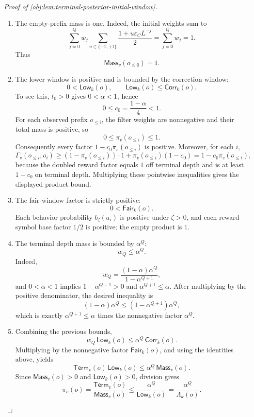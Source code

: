 \begin{proof}[Proof of \cref{obj:lem:terminal-posterior-initial-window}]
\begin{enumerate}
\item The empty-prefix mass is one.  Indeed, the initial weights sum to
\[
\sum_{j=0}^Q
w_j
\sum_{u\in\{-1,+1\}}
\frac{1+u\varepsilon_C L^{-j}}2
=
\sum_{j=0}^Q w_j
=
1.
\]
Thus
\[
\mathsf{Mass}_v(o_{\le0})=1.
\]

\item The lower window is positive and is bounded by the correction window:
\[
0<\mathsf{Low}_k(o),
\qquad
\mathsf{Low}_k(o)\le \mathsf{Corr}_k(o).
\]
To see this, \(t_0>0\) gives \(0<\alpha<1\), hence
\[
0\le c_0=\frac{1-\alpha}{4}<1.
\]
For each observed prefix \(o_{\le i}\), the filter weights are nonnegative and their total mass is positive, so
\[
0\le \pi_v(o_{\le i})\le 1.
\]
Consequently every factor \(1-c_0\pi_v(o_{\le i})\) is positive.  Moreover, for each \(i\),
\[
\Gamma_v(o_{\le i},o_i)
\ge
(1-\pi_v(o_{\le i}))\cdot 1
+
\pi_v(o_{\le i})(1-c_0)
=
1-c_0\pi_v(o_{\le i}),
\]
because the doubled reward factor equals \(1\) off terminal depth and is at least \(1-c_0\) on terminal depth.  Multiplying these pointwise inequalities gives the displayed product bound.

\item The fair-window factor is strictly positive:
\[
0<\mathsf{Fair}_k(o).
\]
Each behavior probability \(b_\zeta(a_i)\) is positive under \(\zeta>0\), and each reward-symbol base factor \(1/2\) is positive; the empty product is \(1\).

\item The terminal depth mass is bounded by \(\alpha^Q\):
\[
w_Q\le \alpha^Q.
\]
Indeed,
\[
w_Q=\frac{(1-\alpha)\alpha^Q}{1-\alpha^{Q+1}},
\]
and \(0<\alpha<1\) implies \(1-\alpha^{Q+1}>0\) and \(\alpha^{Q+1}\le \alpha\).  After multiplying by the positive denominator, the desired inequality is
\[
(1-\alpha)\alpha^Q
\le
(1-\alpha^{Q+1})\alpha^Q,
\]
which is exactly \(\alpha^{Q+1}\le\alpha\) times the nonnegative factor \(\alpha^Q\).

\item Combining the previous bounds,
\[
w_Q\,\mathsf{Low}_k(o)
\le
\alpha^Q\,\mathsf{Corr}_k(o).
\]
Multiplying by the nonnegative factor \(\mathsf{Fair}_k(o)\), and using the identities above, yields
\[
\mathsf{Term}_v(o)\,\mathsf{Low}_k(o)
\le
\alpha^Q\,\mathsf{Mass}_v(o).
\]
Since \(\mathsf{Mass}_v(o)>0\) and \(\mathsf{Low}_k(o)>0\), division gives
\[
\pi_v(o)
=
\frac{\mathsf{Term}_v(o)}{\mathsf{Mass}_v(o)}
\le
\frac{\alpha^Q}{\mathsf{Low}_k(o)}
=
\frac{\alpha^Q}{\Lambda_k(o)}.
\]
\end{enumerate}
\end{proof}

